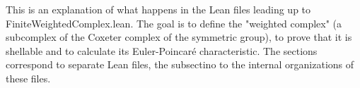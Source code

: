 



This is an explanation of what happens in the Lean files leading up to FiniteWeightedComplex.lean. The goal is to define the "weighted complex" (a subcomplex of the Coxeter complex of the
symmetric group), to prove that it is shellable and to calculate its Euler-Poincaré characteristic. The sections correspond to separate Lean files, the subsectino to the
internal organizations of these files.



